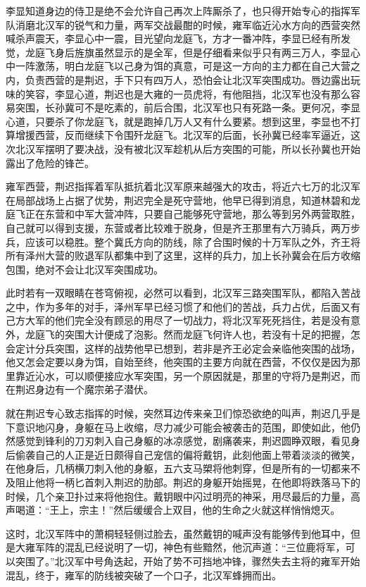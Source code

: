 李显知道身边的侍卫是绝不会允许自己再次上阵厮杀了，也只得开始专心的指挥军队消磨北汉军的锐气和力量，两军交战最酣的时候，雍军临近沁水方向的西营突然喊杀声震天，李显心中一震，目光望向龙庭飞，方才一番冲阵，李显已经有所发觉，龙庭飞身后旌旗虽然显示的是全军，但是仔细看来似乎只有两三万人，李显心中一阵激荡，明白龙庭飞以己身为饵的真意，可是这一方向的主力都在自己大营之内，负责西营的是荆迟，手下只有四万人，恐怕会让北汉军突围成功。唇边露出玩味的笑容，李显心道，荆迟也是大雍的一员虎将，有他阻挡，北汉军也没有那么容易突围，长孙冀可不是吃素的，前后合围，北汉军也只有死路一条。更何况，李显心道，只要杀了你龙庭飞，就是跑掉几万人又有什么要紧。想到这里，李显也不打算增援西营，反而继续下令围歼龙庭飞。北汉军的后面，长孙冀已经率军逼近，这次北汉军摆明了要决战，没有被北汉军趁机从后方突围的可能，所以长孙冀也开始露出了危险的锋芒。

雍军西营，荆迟指挥着军队抵抗着北汉军原来越强大的攻击，将近六七万的北汉军在局部战场上占据了优势，荆迟完全是死守营地，他早已得到消息，知道林碧和龙庭飞正在东营和中军大营冲阵，只要自己能够死守营地，那么等到另外两营取胜，自己就可以得到支援，东营或者比较难于脱身，但是齐王那里有六万骑兵，两万步兵，应该可以稳胜。整个冀氏方向的防线，除了合围时候的十万军队之外，齐王将所有泽州大营的败退军队都集中到了这里，这样的兵力，加上长孙冀会在后方收缩包围，绝对不会让北汉军突围成功。

此时若有一双眼睛在苍穹俯视，必然可以看到，北汉军三路突围军队，都陷入苦战之中，作为多年的对手，泽州军早已经习惯了和他们的苦战，兵力占优，后面又有己方大军的他们完全没有顾忌的用尽了一切战力，将北汉军死死挡住，若是没有意外，龙庭飞的突围大计便成了泡影。然而龙庭飞何许人也，若没有十足的把握，怎会定计分兵突围，这样的战势他早已想到，若非是齐王必定会亲临他突围的战场，他又怎会定要以身为饵，自始至终，他突围的主要方向就在西营，不仅仅是因为那里靠近沁水，可以顺便接应水军突围，另一个原因就是，那里的守将乃是荆迟，而在荆迟身边有一个魔宗弟子潜伏。

就在荆迟专心致志指挥的时候，突然耳边传来亲卫们惊恐欲绝的叫声，荆迟几乎是下意识地闪身，身躯在马上收缩，尽力减少可能会被袭击的范围，即使如此，他仍然感觉到锋利的刀刃刺入自己身躯的冰凉感觉，剧痛袭来，荆迟圆睁双眼，看见身后偷袭自己的人正是近日颇得自己宠信的偏将戴钥，此刻他面上带着淡淡的微笑，在他身后，几柄横刀刺入他的身躯，五六支马槊将他刺穿，但是所有的一切都来不及阻止他将一柄匕首刺入荆迟的肋部。荆迟的身躯开始摇晃，在他即将跌落马下的时候，几个亲卫扑过来将他抱住。戴钥眼中闪过明亮的神采，用尽最后的力量，高声喝道：“王上，宗主！”然后缓缓合上双目，他的生命之火就这样悄悄熄灭。

这时，北汉军阵中的萧桐轻轻侧过脸去，虽然戴钥的喊声没有能够传到他耳中，但是大雍军阵的混乱已经说明了一切，神色有些黯然，他沉声道：“三位鹿将军，可以突围了。”北汉军中号角迭起，开始了势不可挡地冲锋，骤然失去主将的雍军开始混乱，终于，雍军的防线被突破了一个口子，北汉军蜂拥而出。

